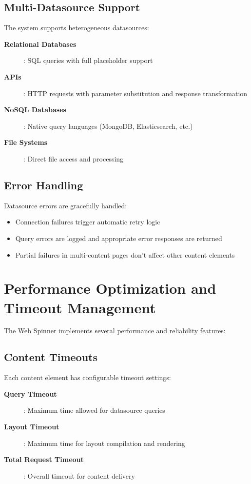 \subsection{Multi-Datasource Support}

The system supports heterogeneous datasources:

\begin{description}
	\item[\textbf{Relational Databases}]: SQL queries with full \wbpl{} placeholder support
	\item[\textbf{\rest{} APIs}]: HTTP requests with parameter substitution and response transformation
	\item[\textbf{NoSQL Databases}]: Native query languages (MongoDB, Elasticsearch, etc.)
	\item[\textbf{File Systems}]: Direct file access and processing
\end{description}

\subsection{Error Handling}

Datasource errors are gracefully handled:
\begin{itemize}
	\item Connection failures trigger automatic retry logic
	\item Query errors are logged and appropriate error responses are returned
	\item Partial failures in multi-content pages don't affect other content elements
\end{itemize}

\section{Performance Optimization and Timeout Management}
\label{sec:performance-optimization}

The Web Spinner implements several performance and reliability features:

\subsection{Content Timeouts}

Each content element has configurable timeout settings:

\begin{description}
	\item[\textbf{Query Timeout}]: Maximum time allowed for datasource queries
	\item[\textbf{Layout Timeout}]: Maximum time for layout compilation and rendering
	\item[\textbf{Total Request Timeout}]: Overall timeout for content delivery
\end{description}

